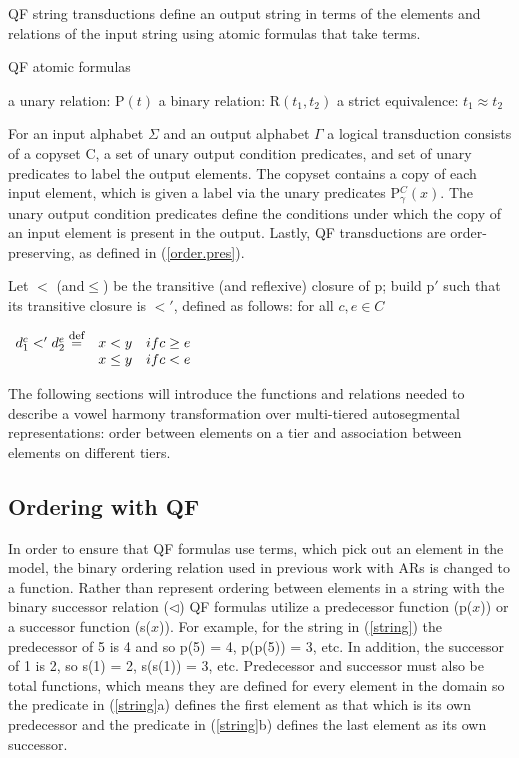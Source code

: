 \documentclass[,doc,floatsintext]{apa6}
\def\defeq{\mathrel{\buildrel \mbox{\footnotesize def} \over =}}
\theoremstyle{definition}
\theoremstyle{definition}
\theoremstyle{definition}
\theoremstyle{remark}
\begin{document}
QF string transductions define an output string in terms of the elements
and relations of the input string using atomic formulas that take terms.

\begin{exe}
\ex QF atomic formulas\label{atom}
  \begin{xlist}
  \ex a unary relation: P$(t)$
  \ex a binary relation: R$(t_1, t_2)$ 
  \ex a strict equivalence: $t_1 \approx t_2$
  \end{xlist}
\end{exe}

\noindent For an input alphabet \(\Sigma\) and an output alphabet
\(\Gamma\) a logical transduction consists of a copyset C, a set of
unary output condition predicates, and set of unary predicates to label
the output elements. The copyset contains a copy of each input element,
which is given a label via the unary predicates P\(^C_{\gamma}(x)\). The
unary output condition predicates define the conditions under which the
copy of an input element is present in the output. Lastly, QF
transductions are order-preserving, as defined in (\ref{order.pres}).

\begin{exe}
\ex\label{order.pres} Let $<$ (and$\leq$) be the transitive (and reflexive) closure of p; build p$'$ such that its transitive closure is $<'$, defined as follows: for all $c, e\in C$
\end{exe}

\hspace{1.85in}
\(\begin{array}{ccc} d^c_1 <' d^e_2 \defeq & x<y & if c\geq e \\  & x\leq y & if c<e \end{array}\)
\vspace{0.2in}

The following sections will introduce the functions and relations needed
to describe a vowel harmony transformation over multi-tiered
autosegmental representations: order between elements on a tier and
association between elements on different tiers.

\subsection{Ordering with QF}\label{ordering-with-qf}

In order to ensure that QF formulas use terms, which pick out an element
in the model, the binary ordering relation used in previous work with
ARs is changed to a function. Rather than represent ordering between
elements in a string with the binary successor relation (\(\lhd\)) QF
formulas utilize a predecessor function (p(\(x\))) or a successor
function (s(\(x\))). For example, for the string in (\ref{string}) the
predecessor of 5 is 4 and so p(5) = 4, p(p(5)) = 3, etc. In addition,
the successor of 1 is 2, so s(1) = 2, s(s(1)) = 3, etc. Predecessor and
successor must also be total functions, which means they are defined for
every element in the domain so the predicate in (\ref{string}a) defines
the first element as that which is its own predecessor and the predicate
in (\ref{string}b) defines the last element as its own successor.
\end{document}
